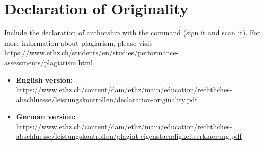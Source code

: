 
%


\chapter{Declaration of Originality}\label{chap:originality}
Include the declaration of authorship with the  command (sign it and scan it). For more information
about plagiarism, please visit
\url{https://www.ethz.ch/students/en/studies/performance-assessments/plagiarism.html}

\begin{itemize}
\item \textbf{English version:}
  \url{https://www.ethz.ch/content/dam/ethz/main/education/rechtliches-abschluesse/leistungskontrollen/declaration-originality.pdf}
\item \textbf{German version:}
  \url{https://www.ethz.ch/content/dam/ethz/main/education/rechtliches-abschluesse/leistungskontrollen/plagiat-eigenstaendigkeitserklaerung.pdf}
\end{itemize}


